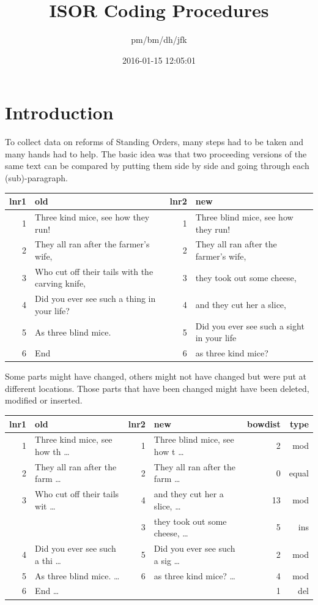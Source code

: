 \documentclass[10pt,]{article}
\title{ISOR Coding Procedures}
\author{pm/bm/dh/jfk}
\date{2016-01-15 12:05:01}
\begin{document}
\maketitle

{
\hypersetup{linkcolor=black}
\setcounter{tocdepth}{2}
\tableofcontents
}
\makeatletter
\newcommand{\justified}{%
  \rightskip\z@skip%
  \leftskip\z@skip} \makeatother

\newpage

\section{Introduction}\label{introduction}

To collect data on reforms of Standing Orders, many steps had to be
taken and many hands had to help. The basic idea was that two proceeding
versions of the same text can be compared by putting them side by side
and going through each (sub)-paragraph.

\begin{longtable}[c]{@{}rlrl@{}}
\toprule
lnr1 & old & lnr2 & new\tabularnewline
\midrule
\endhead
1 & Three kind mice, see how they run! & 1 & Three blind mice, see how
they run!\tabularnewline
2 & They all ran after the farmer's wife, & 2 & They all ran after the
farmer's wife,\tabularnewline
3 & Who cut off their tails with the carving knife, & 3 & they took out
some cheese,\tabularnewline
4 & Did you ever see such a thing in your life? & 4 & and they cut her a
slice,\tabularnewline
5 & As three blind mice. & 5 & Did you ever see such a sight in your
life\tabularnewline
6 & End & 6 & as three kind mice?\tabularnewline
\bottomrule
\end{longtable}

Some parts might have changed, others might not have changed but were
put at different locations. Those parts that have been changed might
have been deleted, modified or inserted.

\begin{longtable}[c]{@{}rlrlrr@{}}
\toprule
lnr1 & old & lnr2 & new & bowdist & type\tabularnewline
\midrule
\endhead
1 & Three kind mice, see how th \ldots{} & 1 & Three blind mice, see how
t \ldots{} & 2 & mod\tabularnewline
2 & They all ran after the farm \ldots{} & 2 & They all ran after the
farm \ldots{} & 0 & equal\tabularnewline
3 & Who cut off their tails wit \ldots{} & 4 & and they cut her a slice,
\ldots{} & 13 & mod\tabularnewline
& & 3 & they took out some cheese, \ldots{} & 5 & ins\tabularnewline
4 & Did you ever see such a thi \ldots{} & 5 & Did you ever see such a
sig \ldots{} & 2 & mod\tabularnewline
5 & As three blind mice. \ldots{} & 6 & as three kind mice? \ldots{} & 4
& mod\tabularnewline
6 & End \ldots{} & & & 1 & del\tabularnewline
\bottomrule
\end{longtable}
\end{document}
